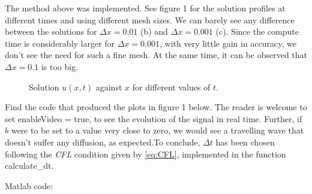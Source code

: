 \begin{questions}
\begin{solution}
The method above was implemented. See figure 1 for the solution profiles at different times and using different mesh sizes. We can barely see any difference between the solutions for $\Delta x=0.01$ (b) and $\Delta x=0.001$ (c). Since the compute time is considerably larger for $\Delta x=0.001$, with very little gain in accuracy, we don't see the need for such a fine mesh. At the same time, it can be observed that $\Delta x = 0.1$ is too big.
\begin{figure}[H]
\centering     %
{}
\hspace{-0.9cm}
\hspace{-0.9cm}
\caption{Solution $u(x,t)$ against $x$ for different values of $t$.}
\end{figure}
Find the code that produced the plots in figure 1 below. The reader is welcome to set \textsf{enableVideo = true}, to see the evolution of the signal in real time. Further, if $b$ were to be set to a value very close to zero, we would see a travelling wave that doesn't suffer any diffusion, as expected.To conclude, $\Delta t$ has been chosen following the \textit{CFL} condition given by \eqref{eq:CFL}, implemented in the function \textsf{calculate\_dt}.

Matlab code:

\end{solution}
\end{questions}